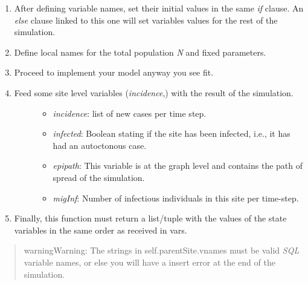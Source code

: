 \documentclass[a4paper,10pt,english]{sphinxmanual}
\begin{document}
\begin{enumerate}
\begin{description}
\begin{enumerate}
\item {} 
After defining variable names, set their initial values in the same \emph{if} clause. An \emph{else} clause linked to this one will set variables values for the rest of the simulation.

\item {} 
Define local names for the total population \emph{N} and fixed parameters.

\item {} 
Proceed to implement your model anyway you see fit.

\item {} \begin{description}
\item[{Feed some site level variables (\emph{incidence},) with the result of the simulation.}] \leavevmode\begin{itemize}
\item {} 
\emph{incidence}: list of new cases per time step.

\item {} 
\emph{infected}: Boolean stating if the site has been infected, i.e., it has had an autoctonous case.

\item {} 
\emph{epipath}: This variable is at the graph level and contains the path of spread of the simulation.

\item {} 
\emph{migInf}: Number of infectious individuals in this site per time-step.

\end{itemize}

\end{description}

\item {} 
Finally, this function must return a list/tuple with the values of the state variables in the same order as received in vars.

\end{enumerate}

\end{description}

\end{enumerate}
\begin{quote}

\begin{notice}{warning}{Warning:}
The strings in self.parentSite.vnames must be valid \emph{SQL} variable names, or else you will have a insert error at the end of the simulation.
\end{notice}
\end{quote}
\end{document}
